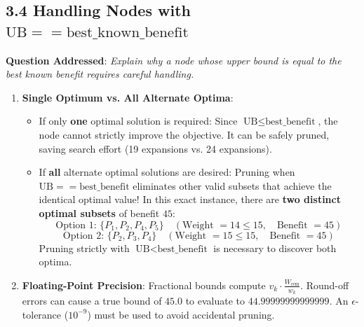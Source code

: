 \documentclass[12pt]{article}
\begin{document}
\subsection*{3.4 Handling Nodes with $\text{UB} == \text{best\_known\_benefit}$}
\textbf{Question Addressed}: \textit{Explain why a node whose upper bound is equal to the best known benefit requires careful handling.}
\begin{enumerate}
    \item \textbf{Single Optimum vs. All Alternate Optima}:
    \begin{itemize}
        \item If only \textbf{one} optimal solution is required: Since $\text{UB} \le \text{best\_benefit}$, the node cannot strictly improve the objective. It can be safely pruned, saving search effort (19 expansions vs. 24 expansions).
        \item If \textbf{all} alternate optimal solutions are desired: Pruning when $\text{UB} == \text{best\_benefit}$ eliminates other valid subsets that achieve the identical optimal value! In this exact instance, there are \textbf{two distinct optimal subsets} of benefit $45$:
        \[
        \text{Option 1: } \{P_1, P_2, P_4, P_5\} \quad (\text{Weight } = 14 \le 15, \quad \text{Benefit } = 45)
        \]
        \[
        \text{Option 2: } \{P_2, P_3, P_4\} \quad (\text{Weight } = 15 \le 15, \quad \text{Benefit } = 45)
        \]
        Pruning strictly with $\text{UB} < \text{best\_benefit}$ is necessary to discover both optima.
    \end{itemize}
    \item \textbf{Floating-Point Precision}: Fractional bounds compute $v_k \cdot \frac{W_{\text{rem}}}{w_k}$. Round-off errors can cause a true bound of $45.0$ to evaluate to $44.99999999999999$. An $\epsilon$-tolerance ($10^{-9}$) must be used to avoid accidental pruning.
\end{enumerate}
\end{document}
